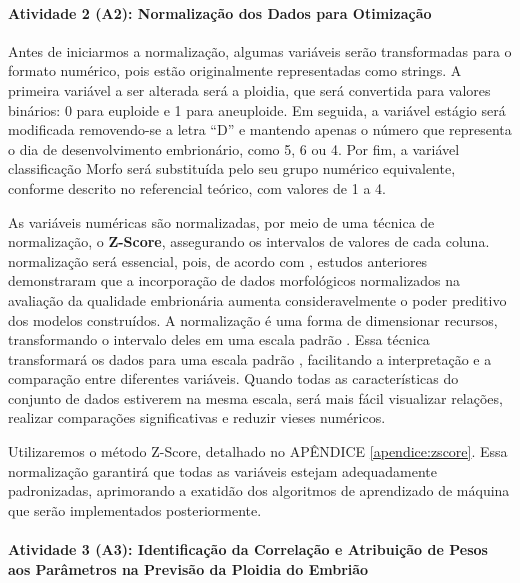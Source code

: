 \paragraph{\textbf{Atividade 2 (A2):} Normalização dos Dados para Otimização}

Antes de iniciarmos a normalização, algumas variáveis serão transformadas para o formato numérico, pois estão originalmente representadas como strings. A primeira variável a ser alterada será a ploidia, que será convertida para valores binários: 0 para euploide e 1 para aneuploide. Em seguida, a variável estágio será modificada removendo-se a letra “D” e mantendo apenas o número que representa o dia de desenvolvimento embrionário, como 5, 6 ou 4. Por fim, a variável classificação Morfo será substituída pelo seu grupo numérico equivalente, conforme descrito no referencial teórico, com valores de 1 a 4.

As variáveis numéricas são normalizadas, por meio de uma técnica de normalização, o \textbf{Z-Score}, assegurando os intervalos de valores de cada coluna. normalização será essencial, pois, de acordo com , estudos anteriores demonstraram que a incorporação de dados morfológicos normalizados na avaliação da qualidade embrionária aumenta consideravelmente o poder preditivo dos modelos construídos. A normalização é uma forma de dimensionar recursos, transformando o intervalo deles em uma escala padrão \cite{jaiswal2024}. Essa técnica transformará os dados para uma escala padrão \cite{jaiswal2024}, facilitando a interpretação e a comparação entre diferentes variáveis. Quando todas as características do conjunto de dados estiverem na mesma escala, será mais fácil visualizar relações, realizar comparações significativas e reduzir vieses numéricos.

Utilizaremos o método Z-Score, detalhado no APÊNDICE \ref{apendice:zscore}. Essa normalização garantirá que todas as variáveis estejam adequadamente padronizadas, aprimorando a exatidão dos algoritmos de aprendizado de máquina que serão implementados posteriormente.

\paragraph{\textbf{Atividade 3 (A3):} Identificação da Correlação e Atribuição de Pesos aos Parâmetros na Previsão da Ploidia do Embrião}

